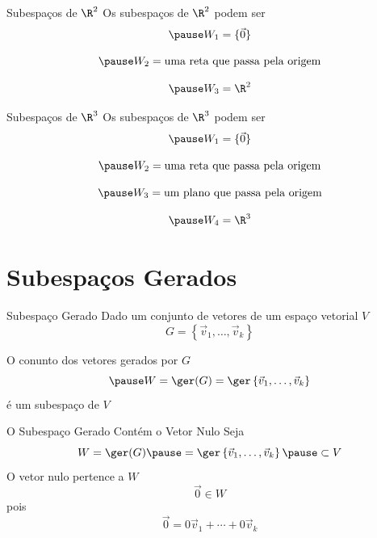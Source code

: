 \documentclass[fleqn,aspectratio=169,12pt]{beamer}
\begin{document}
\begin{frame}{Subespaços de $\R^2$}
  Os subespaços de $\R^{2}$ podem ser
  \[
    \pause
    W_1 = \{\vec{0}\}
  \]

  \[
    \pause
    W_2 = \text{uma reta que passa pela origem}
  \]

  \[
    \pause
    W_3 = \R^2
  \]
\end{frame}

\begin{frame}{Subespaços de $\R^{3}$}
  Os subespaços de $\R^{3}$ podem ser
  \[
    \pause
    W_1 = \{\vec{0}\}
  \]

  \[
    \pause
    W_2 = \text{uma reta que passa pela origem}
  \]

  \[
    \pause
    W_3 = \text{um plano que passa pela origem}
  \]

  \[
    \pause
    W_4 = \R^{3}
  \]
\end{frame}

\section{Subespaços Gerados}

\begin{frame}{Subespaço Gerado}
  Dado um conjunto de vetores de um espaço vetorial $V$
  \[
    G = \left\{ \vec{v}_{1}, \ldots, \vec{v}_{k} \right\}
  \]

  \bigskip
  \pause
  O conunto dos vetores gerados por $G$
  \[
    \pause
    W = \ger(G) = \ger \left\{ \vec{v}_{1}, \ldots, \vec{v}_{k} \right\}
  \]
  \pause
  é um subespaço de $V$
\end{frame}

\begin{proofframe}{O Subespaço Gerado Contém o Vetor Nulo}
  Seja
  \[
    W
    = \ger(G)
    \pause
    = \ger \left\{ \vec{v}_{1}, \ldots, \vec{v}_{k} \right\}
    \pause
    \subset V
  \]
  \pause
  O vetor nulo pertence a $W$
  \[
    \vec{0} \in W
  \]
  \pause
  pois
  \[
    \vec{0} = 0\vec{v}_{1} + \cdots + 0\vec{v}_{k}
  \]
\end{proofframe}
\end{document}
